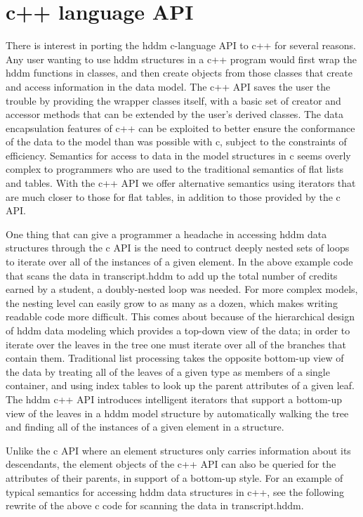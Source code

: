 \documentclass{revtex4}
\begin{document}
\section{c++ language API}
There is interest in porting the hddm c-language API to c++ for several reasons.
Any user wanting to use hddm structures in a c++ program would first wrap the hddm 
functions in classes, and then create objects from those classes that create and access
information in the data model.  The c++ API saves the user the trouble by providing the
wrapper classes itself, with a basic set of creator and accessor methods that can be
extended by the user's derived classes.  The data encapsulation features of c++ can
be exploited to better ensure the conformance of the data to the model than was 
possible with c, subject to the constraints of efficiency.  Semantics for access to
data in the model structures in c seems overly complex to programmers who are used
to the traditional semantics of flat lists and tables.  With the c++ API we offer
alternative semantics using iterators that are much closer to those for flat tables,
in addition to those provided by the c API.

One thing that can give a programmer a headache in accessing hddm data structures
through the c API is the need to contruct deeply nested sets of loops to iterate over
all of the instances of a given element.  In the above example code that scans the data
in transcript.hddm to add up the total number of credits earned by a student, a
doubly-nested loop was needed.  For more complex models, the nesting level can easily
grow to as many as a dozen, which makes writing readable code more difficult. This
comes about because of the hierarchical design of hddm data modeling which provides
a top-down view of the data; in order to iterate over the leaves in the tree one must
iterate over all of the branches that contain them.  Traditional list processing 
takes the opposite bottom-up view of the data by treating all of the leaves of a 
given type as members of a single container, and using index tables to look up the
parent attributes of a given leaf.  The hddm c++ API introduces intelligent iterators
that support a bottom-up view of the leaves in a hddm model structure by automatically
walking the tree and finding all of the instances of a given element in a structure.  

Unlike the c API where an element structures only carries information about its
descendants, the element objects of the c++ API can also be queried for the attributes
of their parents, in support of a bottom-up style.  For an example of typical
semantics for accessing hddm data structures in c++, see the following rewrite of
the above c code for scanning the data in transcript.hddm.
\end{document}
